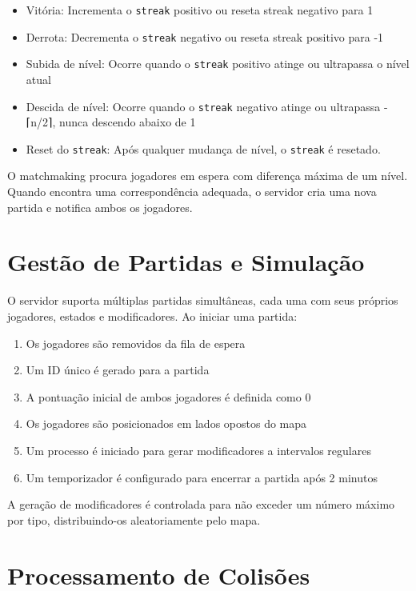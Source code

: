 \documentclass[12pt,a4paper]{report}
\begin{document}
\begin{itemize}
    \item Vitória: Incrementa o \texttt{streak} positivo ou reseta streak negativo para 1
    \item Derrota: Decrementa o \texttt{streak} negativo ou reseta streak positivo para -1
    \item Subida de nível: Ocorre quando o \texttt{streak} positivo atinge ou ultrapassa o nível atual
    \item Descida de nível: Ocorre quando o \texttt{streak} negativo atinge ou ultrapassa -⌈n/2⌉, nunca descendo abaixo de 1
    \item Reset do \texttt{streak}: Após qualquer mudança de nível, o \texttt{streak} é resetado.
\end{itemize}

O matchmaking procura jogadores em espera com diferença máxima de um nível. Quando encontra uma correspondência adequada, o servidor cria uma nova partida e notifica ambos os jogadores.

\section{Gestão de Partidas e Simulação}

O servidor suporta múltiplas partidas simultâneas, cada uma com seus próprios jogadores, estados e modificadores. Ao iniciar uma partida:

\begin{enumerate}
    \item Os jogadores são removidos da fila de espera
    \item Um ID único é gerado para a partida
    \item A pontuação inicial de ambos jogadores é definida como 0
    \item Os jogadores são posicionados em lados opostos do mapa
    \item Um processo é iniciado para gerar modificadores a intervalos regulares
    \item Um temporizador é configurado para encerrar a partida após 2 minutos
\end{enumerate}

A geração de modificadores é controlada para não exceder um número máximo por tipo, distribuindo-os aleatoriamente pelo mapa.

\section{Processamento de Colisões}
\end{document}
